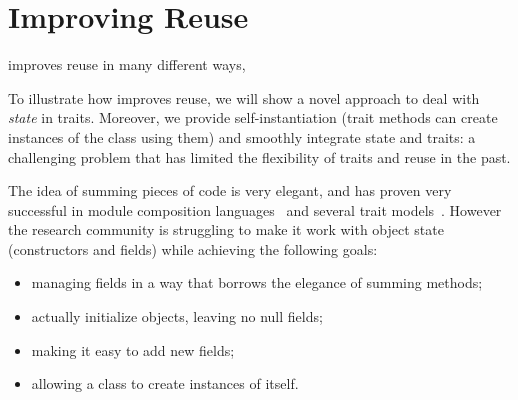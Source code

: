 \saveSpace\saveSpace\section{Improving Reuse}\saveSpace



\name improves reuse in many different ways,

To illustrate how \name improves reuse,
we will show a novel approach
to deal with \emph{state} in traits.
Moreover, we provide self-instantiation (trait methods can create instances of the class using them)
 and smoothly integrate state and traits: a challenging problem that has limited the flexibility of traits and
reuse in the past.

The idea of summing pieces of
code is very elegant, and has proven very successful in module
composition languages~\cite{ancona2002calculus} and several trait
models~\cite{Traits:ECOOP2003,Bergel2007,BETTINI2013521,fjig}.  However the research
community is struggling to make it work with object state (constructors
and fields) while achieving the following goals:

\begin{itemize}
\item managing fields in a way that borrows the elegance of summing methods;
\item actually initialize objects, leaving no null fields;
\item making it easy to add new fields;
\item allowing a class to create instances of itself.
\end{itemize}

